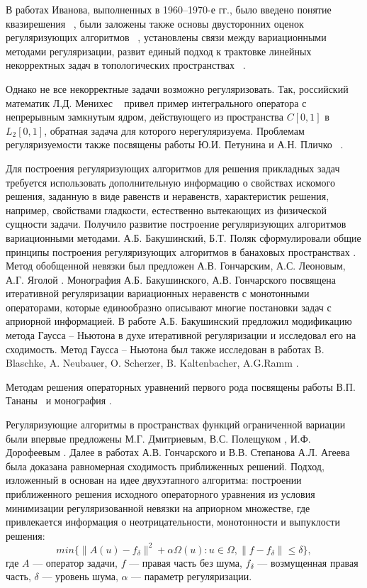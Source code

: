 {В работах Иванова, выполненных в 1960--1970-е гг., было введено понятие квазирешения ~\cite{Iv1962_2, Iv1963}, были заложены также основы двусторонних оценок регуляризующих алгоритмов ~\cite{Iv1966}, установлены связи между вариационными методами регуляризации, развит единый подход к трактовке линейных некорректных задач в топологических пространствах ~\cite{Iv1967}. 

Однако не все некорректные задачи возможно регуляризовать. Так, российский математик Л.Д. Менихес ~\cite{Menih1978} привел пример интегрального оператора с непрерывным замкнутым ядром, действующего из пространства \( C[0,1] \) в \( L_2[0,1] \), обратная задача для которого нерегуляризуема. Проблемам регуляризуемости также посвящены работы Ю.И. Петунина и А.Н. Пличко ~\cite{PetPlich1980}.

Для построения регуляризующих алгоритмов для решения прикладных задач требуется использовать дополнительную информацию о свойствах искомого решения, заданную в виде равенств и неравенств, характеристик решения, например, свойствами гладкости, естественно вытекающих из физической сущности задачи. Получило развитие построение регуляризующих алгоритмов вариационными методами. А.Б. Бакушинский, Б.Т. Поляк сформулировали общие принципы построения регуляризующих алгоритмов в банаховых пространствах \cite{BakPol1974}. Метод обобщенной невязки был предложен А.В. Гончарским, А.С. Леоновым, А.Г. Яголой \cite{GonLeoYag1973}.  Монография А.Б. Бакушинского, А.В. Гончарского \cite{BakGon1989} посвящена итеративной регуляризации вариационных неравенств с монотонными операторами, которые единообразно описывают многие постановки задач с априорной информацией. В работе \cite{Bak1992} А.Б. Бакушинский предложил модификацию метода Гаусса -- Ньютона в духе итеративной регуляризации и исследовал его на сходимость. Метод
Гаусса -- Ньютона был также исследован в работах B. Blaschke, A. Neubauer, O. Scherzer, B. Kaltenbacher, A.G.Ramm \cite{BlaNeuSch1997,KalNeuRam2002}.

Методам решения операторных уравнений первого рода посвящены работы В.П. Тананы~\cite{Tan1977, Tan1997, Tan2003} и монография \cite{Tan1981}.

Регуляризующие алгоритмы в пространствах функций ограниченной вариации были впервые предложены М.Г. Дмитриевым, В.С. Полещуком \cite{DmiPol1972}, И.Ф. Дорофеевым \cite{Dor1979}. Далее в работах А.В. Гончарского и В.В. Степанова \cite{GonSte1979} А.Л. Агеева \cite{Ag1980} была доказана равномерная сходимость приближенных решений. Подход, изложенный в \cite{TikhGonSteYag1990} основан на идее двухэтапного алгоритма: построении приближенного решения  исходного операторного уравнения из условия минимизации регуляризованной невязки на априорном множестве, где привлекается информация о неотрицательности, монотонности и выпуклости решения: $$min\{\| A(u)-f_\delta\| ^2 + \alpha \Omega(u): u\in\Omega, \|f-f_\delta\|\le\delta \},$$ 
где $A$ --- оператор задачи, $f$ --- правая часть без шума, $f_\delta$ --- возмущенная правая часть, $\delta$ --- уровень шума, $\alpha$ --- параметр регуляризации. 

}
